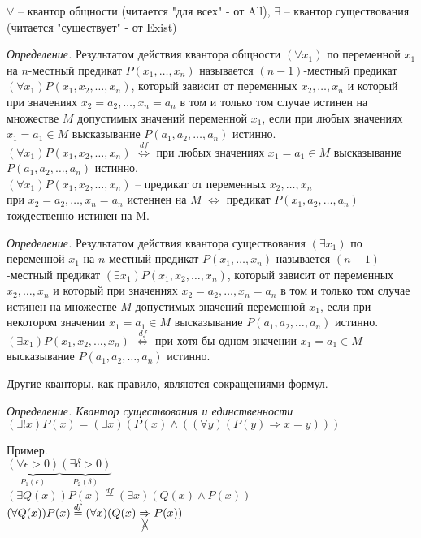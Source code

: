 \documentclass[otchet]{SCWorks}
\begin{document}
\par $\forall$ -- квантор общности (читается "для всех" - от All), $\exists$ -- квантор существования (читается "существует" - от Exist)
\par {\it Определение.} Результатом действия квантора общности $(\forall x_1)$ по переменной $x_1$ на $n$-местный предикат $P(x_1,\dots, x_n)$ называется $(n-1)$-местный предикат $(\forall x_1)P(x_1,x_2,\dots,x_n)$, который зависит от переменных $x_2,\dots,x_n$ и который при значениях $x_2=a_2,\dots,x_n=a_n$ в том и только том случае истинен на множестве $M$ допустимых значений переменной $x_1$, если при любых значениях $x_1 = a_1 \in M$ высказывание $P(a_1, a_2, \dots, a_n)$ истинно. \\
$(\forall x_1)P(x_1,x_2,\dots,x_n)$ $\overset{df}\Leftrightarrow$ при любых значениях $x_1 = a_1 \in M$ высказывание $P(a_1, a_2, \dots, a_n)$ истинно. \\
$(\forall x_1)P(x_1,x_2,\dots,x_n)$ -- предикат от переменных $x_2,\dots,x_n$ \\
при $x_2 = a_2,\dots,x_n = a_n$ истеннен на $M$ $\Leftrightarrow$ предикат $P(x_1, a_2, \dots, a_n)$ тождественно истинен на M.

\par {\it Определение.} Результатом действия квантора существования $(\exists x_1)$ по переменной $x_1$ на $n$-местный предикат $P(x_1,\dots, x_n)$ называется $(n-1)$-местный предикат $(\exists x_1)P(x_1,x_2,\dots,x_n)$, который зависит от переменных $x_2,\dots,x_n$ и который при значениях $x_2=a_2,\dots,x_n=a_n$ в том и только том случае истинен на множестве $M$ допустимых значений переменной $x_1$, если при некотором значении $x_1 = a_1 \in M$ высказывание $P(a_1, a_2, \dots, a_n)$ истинно. \\
$(\exists x_1)P(x_1,x_2,\dots,x_n)$ $\overset{df}\Leftrightarrow$ при хотя бы одном значении $x_1 = a_1 \in M$ высказывание $P(a_1, a_2, \dots, a_n)$ истинно.

\par Другие кванторы, как правило, являются сокращениями формул.

\par {\it Определение. Квантор существования и единственности} $(\exists ! x)P(x) = (\exists x)(P(x) \land ((\forall y)(P(y) \Rightarrow x = y)))$

\par Пример. \\
$\underset{P_1(\epsilon)}{\underbrace{(\forall \epsilon > 0)}} \underset{P_2(\delta)}{\underbrace{(\exists \delta > 0)}}$ \\
$(\exists Q(x))P(x) \overset{df}= (\exists x)(Q(x) \land P(x))$
$(\forall Q(x))P(x) \overset{df}= (\forall x)(Q(x) \underset{\bcancel{\cancel{\land}}}\Rightarrow P(x))$
\end{document}

